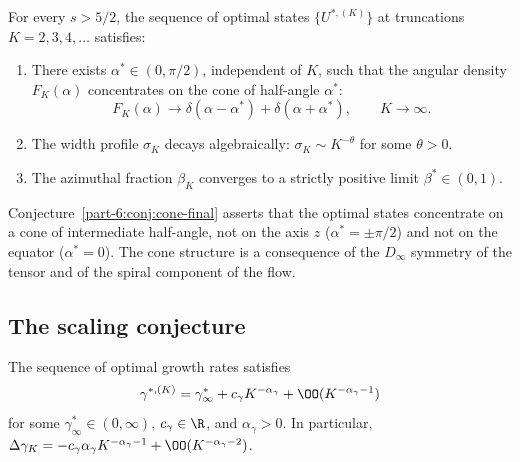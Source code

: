 \begin{conjecture}\label{part-6:conj:cone-final}
For every $s>5/2$, the sequence of optimal states 
$\{U^{\ast,(K)}\}$ at truncations $K=2,3,4,\ldots$ satisfies:
\begin{enumerate}[label=(\roman*),leftmargin=*]
\item There exists $\alpha^\ast\in(0,\pi/2)$, independent of $K$, such 
      that the angular density $F_K(\alpha)$ concentrates on the 
      cone of half-angle $\alpha^\ast$:
      \begin{equation}\label{part-6:eq:cone-conc}
      F_K(\alpha) \to \delta(\alpha-\alpha^\ast) + 
      \delta(\alpha+\alpha^\ast),
      \qquad K\to\infty.
      \end{equation}
\item The width profile $\sigma_K$ decays algebraically:
      $\sigma_K\sim K^{-\theta}$ for some $\theta>0$.
\item The azimuthal fraction $\beta_K$ converges to a strictly 
      positive limit $\beta^\ast\in(0,1)$.
\end{enumerate}
\end{conjecture}

\begin{remark}\label{part-6:rem:cone-content}
Conjecture~\ref{part-6:conj:cone-final} asserts that the optimal states 
concentrate on a cone of intermediate half-angle, not on the axis 
$z$ ($\alpha^\ast=\pm\pi/2$) and not on the equator 
($\alpha^\ast=0$). The cone structure is a consequence of the 
$D_\infty$ symmetry of the tensor and of the spiral component of 
the flow.
\end{remark}

\subsection{The scaling conjecture}
\label{part-6:ssec:scaling-conj}

\begin{conjecture}\label{part-6:conj:scaling}
The sequence of optimal growth rates satisfies
\begin{equation}\label{part-6:eq:scaling-conj}
\gamma^{\ast,(K)} = \gamma^\ast_\infty + c_\gamma K^{-\alpha_\gamma} 
+ \OO(K^{-\alpha_\gamma-1})
\end{equation}
for some $\gamma^\ast_\infty\in(0,\infty)$, $c_\gamma\in\R$, and 
$\alpha_\gamma>0$. In particular, 
$\Delta\gamma_K = -c_\gamma\alpha_\gamma K^{-\alpha_\gamma-1} + 
\OO(K^{-\alpha_\gamma-2})$.
\end{conjecture}

